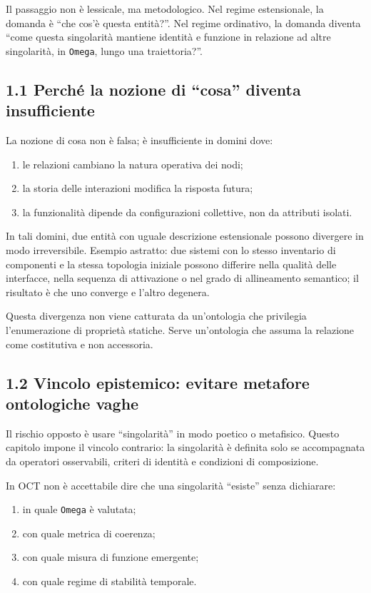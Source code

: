 Il passaggio non è lessicale, ma metodologico. Nel regime estensionale, la domanda è ``che cos'è questa entità?''. Nel regime ordinativo, la domanda diventa ``come questa singolarità mantiene identità e funzione in relazione ad altre singolarità, in \texttt{Omega}, lungo una traiettoria?''.

\subsection{1.1 Perché la nozione di ``cosa'' diventa insufficiente}

La nozione di cosa non è falsa; è insufficiente in domini dove:

\begin{enumerate}
\def\labelenumi{\arabic{enumi}.}
\tightlist
\item
  le relazioni cambiano la natura operativa dei nodi;
\item
  la storia delle interazioni modifica la risposta futura;
\item
  la funzionalità dipende da configurazioni collettive, non da attributi isolati.
\end{enumerate}

In tali domini, due entità con uguale descrizione estensionale possono divergere in modo irreversibile. Esempio astratto: due sistemi con lo stesso inventario di componenti e la stessa topologia iniziale possono differire nella qualità delle interfacce, nella sequenza di attivazione o nel grado di allineamento semantico; il risultato è che uno converge e l'altro degenera.

Questa divergenza non viene catturata da un'ontologia che privilegia l'enumerazione di proprietà statiche. Serve un'ontologia che assuma la relazione come costitutiva e non accessoria.

\subsection{1.2 Vincolo epistemico: evitare metafore ontologiche vaghe}

Il rischio opposto è usare ``singolarità'' in modo poetico o metafisico. Questo capitolo impone il vincolo contrario: la singolarità è definita solo se accompagnata da operatori osservabili, criteri di identità e condizioni di composizione.

In OCT non è accettabile dire che una singolarità ``esiste'' senza dichiarare:

\begin{enumerate}
\def\labelenumi{\arabic{enumi}.}
\tightlist
\item
  in quale \texttt{Omega} è valutata;
\item
  con quale metrica di coerenza;
\item
  con quale misura di funzione emergente;
\item
  con quale regime di stabilità temporale.
\end{enumerate}

